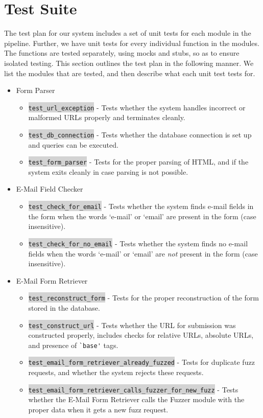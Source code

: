 \section{Test Suite}
\label{Arch:Test}
The test plan for our system includes a set of unit tests for each module in the pipeline. Further, we have unit tests for every %
individual function in the modules. The functions are tested separately, using mocks and stubs, so as to ensure isolated testing.
This section outlines the test plan in the following manner. We list the modules that are tested, and then describe what each unit test tests for.
\begin{itemize}
	\item Form Parser
	\begin{itemize}
		\item \colorbox{lightgray}{\lstinline{test_url_exception}} - Tests whether the system handles incorrect or malformed URLs properly and terminates cleanly.
		\item \colorbox{lightgray}{\lstinline{test_db_connection}} - Tests whether the database connection is set up and queries can be executed.
		\item \colorbox{lightgray}{\lstinline{test_form_parser}} - Tests for the proper parsing of HTML, and if the system exits cleanly in case parsing is not possible.
	\end{itemize}
	
	\item E-Mail Field Checker
	\begin{itemize}
		\item \colorbox{lightgray}{\lstinline{test_check_for_email}} - Tests whether the system finds e-mail fields in the form when the words `e-mail' or `email' are present in the form (case insensitive).
		\item \colorbox{lightgray}{\lstinline{test_check_for_no_email}} - Tests whether the system finds no e-mail fields when the words `e-mail' or `email' are \emph{not} present in the form (case insensitive).
	\end{itemize}
	
	\item E-Mail Form Retriever
	\begin{itemize}
		\item \colorbox{lightgray}{\lstinline{test_reconstruct_form}} - Tests for the proper reconstruction of the form stored in the database.
		\item \colorbox{lightgray}{\lstinline{test_construct_url}} - Tests whether the URL for submission was constructed properly, includes checks for relative URLs, absolute URLs, and presence of \lstinline{`base'} tags.
		\item \colorbox{lightgray}{\lstinline{test_email_form_retriever_already_fuzzed}} - Tests for duplicate fuzz requests, and whether the system rejects these requests.
		\item \colorbox{lightgray}{\lstinline{test_email_form_retriever_calls_fuzzer_for_new_fuzz}} - Tests whether the E-Mail Form Retriever calls the Fuzzer module with the proper data when it gets a new fuzz request.
	\end{itemize}
	

\end{itemize}
